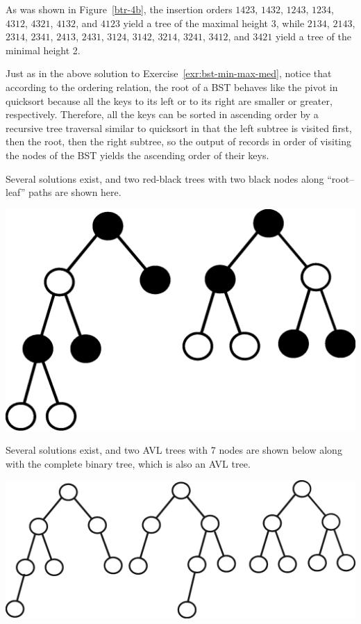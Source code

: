 As was shown in Figure~\ref{btr-4b},
the insertion orders $1423$, $1432$, $1243$, $1234$, $4312$, $4321$,
$4132$, and $4123$ yield a tree of the maximal height 3, while
$2134$, $2143$, $2314$, $2341$, $2413$, $2431$, $3124$, $3142$, $3214$, $3241$, 
$3412$, and $3421$ yield a tree of the minimal height 2.

Just as in the above solution to Exercise~\ref{exr:bst-min-max-med}, notice 
that according to the ordering relation, the root of a BST behaves like 
the pivot in quicksort because all the keys to its left or to its right 
are smaller or greater, respectively. Therefore, all the keys
can be sorted in ascending order by a recursive tree traversal similar to 
quicksort in that the left subtree is visited first, then the root, then 
the right subtree, so the output of records in order of visiting the nodes 
of the BST yields the ascending order of their keys.  

Several solutions exist, and two red-black trees with two black nodes
along ``root--leaf'' paths are shown here.
\begin{center}
\includegraphics[width=0.35\linewidth]{figs/sol-red-black}
\end{center}

Several solutions exist, and two AVL trees with 7 nodes are shown below
along with the complete binary tree, which is also an AVL tree.
\begin{center}
\includegraphics[width=0.5\linewidth]{figs/sol-avl-complete}
\end{center}

